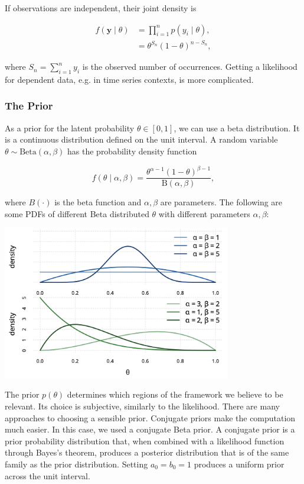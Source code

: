 If observations are independent, their joint density is

\begin{align*}
	f(\bm{y}\mid\theta) &= \prod_{i=1}^n p(y_i\mid\theta), \\
	&= \theta^{S_n}(1-\theta)^{n-S_n},
\end{align*}

where $S_n = \sum^n_{i=1}y_i$ is the observed number of occurrences. Getting a likelihood for dependent data, e.g. in time series contexts, is more complicated.

\subsubsection{The Prior}

As a prior for the latent probability $\theta \in [0,1]$, we can use a beta distribution. It is a continuous distribution defined on the unit interval. A random variable $\theta \sim \mathrm{Beta}(\alpha,\beta)$ has the probability density function

\begin{equation}
	f(\theta\mid \alpha,\beta) = \frac{\theta^{\alpha-1}(1-\theta)^{\beta-1}}{\mathrm{B}(\alpha,\beta)},
\end{equation}

where $B(\cdot)$ is the beta function and $\alpha,\beta$ are parameters. The following are some PDFs of different Beta distributed $\theta$ with different parameters $\alpha,\beta$:

\begin{center}
	\includegraphics[width = 10cm]{betapdf.png}
\end{center}

The prior $p(\theta)$ determines which regions of the framework we believe to be relevant. Its choice is subjective, similarly to the likelihood. There are many approaches to choosing a sensible prior. Conjugate priors make the computation much easier. In this case, we used a conjugate Beta prior. A conjugate prior is a prior probability distribution that, when combined with a likelihood function through Bayes's theorem, produces a posterior distribution that is of the same family as the prior distribution. Setting $a_0 = b_0 = 1$ produces a uniform prior across the unit interval. 

